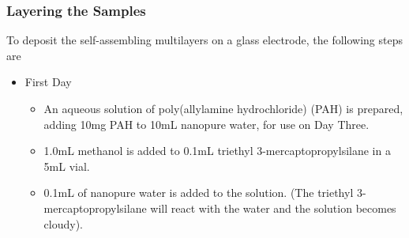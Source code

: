 \documentclass[12pt,oneside,english]{article}
\begin{document}
    \subsubsection{Layering the Samples}
    To deposit the self-assembling multilayers on a glass electrode, the following steps are 
    \begin{itemize}
        \item First Day
        \begin{itemize}
            \item An aqueous solution of poly(allylamine hydrochloride) (PAH) is prepared, adding 10mg PAH to 10mL nanopure water, for use on Day Three.
            \item 1.0mL methanol is added to 0.1mL triethyl 3-mercaptopropylsilane in a 5mL vial.
            \item 0.1mL of nanopure water is added to the solution.  (The triethyl 3-mercaptopropylsilane will react with the water and the solution becomes cloudy).
            

\end{itemize}
\end{itemize}
\end{document}
